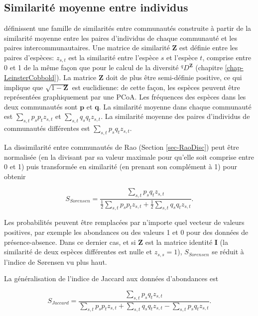 \documentclass[
  11pt,
  french,
  a4paper,
  extrafontsizes,onecolumn,openright
  ]{memoir}
\begin{document}
\subsection{Similarité moyenne entre individus}\label{similarituxe9-moyenne-entre-individus}

\textcite{Pavoine2014b} définissent une famille de similarités entre communautés construite à partir de la similarité moyenne entre les paires d'individus de chaque communauté et les paires intercommunautaires.
Une matrice de similarité \(\mathbf{Z}\) est définie entre les paires d'espèces: \(z_{s,t}\) est la similarité entre l'espèce \(s\) et l'espèce \(t\), comprise entre 0 et 1 de la même façon que pour le calcul de la diversité \(^q\!D^{\mathbf{Z}}\) (chapitre \ref{chap-LeinsterCobbold}).
La matrice \(\mathbf{Z}\) doit de plus être semi-définie positive, ce qui implique que \(\sqrt{1-\mathbf{Z}}\) est euclidienne: de cette façon, les espèces peuvent être représentées graphiquement par une PCoA.
Les fréquences des espèces dans les deux communautés sont \(\mathbf{p}\) et \(\mathbf{q}\).
La similarité moyenne dans chaque communauté est \(\sum_{s,t}{p_s p_t z_{s,t}}\) et \(\sum_{s,t}{q_s q_t z_{s,t}}\).
La similarité moyenne des paires d'individus de communautés différentes est \(\sum_{s,t}{p_s q_t z_{s,t}}\).

La dissimilarité entre communautés de Rao (Section \ref{sec-RaoDisc}) peut être normalisée (en la divisant par sa valeur maximale pour qu'elle soit comprise entre 0 et 1) puis transformée en similarité (en prenant son complément à 1) pour obtenir

\begin{equation}
  \label{eq:SorensenAbd}
  S_{\mathit{Sorensen}} = \frac{\sum_{s,t}{p_s q_t z_{s,t}}}{\frac{1}{2}\sum_{s,t}{p_s p_t z_{s,t}} + \frac{1}{2}\sum_{s,t}{q_s q_t z_{s,t}}}.
\end{equation}

Les probabilités peuvent être remplacées par n'importe quel vecteur de valeurs positives, par exemple les abondances ou des valeurs 1 et 0 pour des données de présence-absence.
Dans ce dernier cas, et si \(\mathbf{Z}\) est la matrice identité \(\mathbf{I}\) (la similarité de deux espèces différentes est nulle et \(z_{s,s}=1\)), \(S_{\mathit{Sorensen}}\) se réduit à l'indice de Sørensen vu plus haut.

La généralisation de l'indice de Jaccard aux données d'abondances est

\begin{equation}
  \label{eq:JaccardAbd}
  S_{\mathit{Jaccard}} = \frac{\sum_{s,t}{p_s q_t z_{s,t}}}{\sum_{s,t}{p_s p_t z_{s,t}} + \sum_{s,t}{q_s q_t z_{s,t}} - \sum_{s,t}{p_s q_t z_{s,t}}}.
\end{equation}
\end{document}
